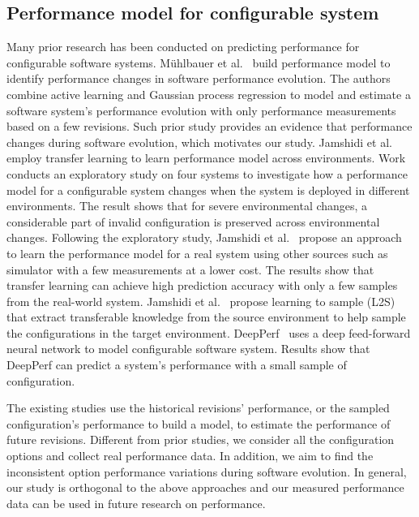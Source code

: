 \subsection{Performance model for configurable system}
Many prior research has been conducted on predicting performance for configurable software systems. 
M{\"{u}}hlbauer et al.~\cite{DBLP:conf/kbse/MuhlbauerAS19,DBLP:conf/kbse/MuhlbauerAS20} build performance model to identify performance changes in software performance evolution. The authors combine active learning and Gaussian process regression to model and estimate a software system’s performance evolution with only performance measurements based on a few revisions. Such prior study provides an evidence that performance changes during software evolution, which motivates our study. Jamshidi et al.~\cite{DBLP:conf/kbse/JamshidiSVKPA17,DBLP:conf/icse/JamshidiVKSK17,DBLP:conf/sigsoft/JamshidiVKS18} employ transfer learning to learn performance model across environments. Work~\cite{DBLP:conf/kbse/JamshidiSVKPA17} conducts an exploratory study on four systems to investigate how a performance model for a configurable system changes when the system is deployed in different environments. The result shows that for severe environmental changes, a considerable part of invalid configuration is preserved across environmental changes. Following the exploratory study, Jamshidi et al.~\cite{DBLP:conf/icse/JamshidiVKSK17} propose an approach to learn the performance model for a real system using other sources such as simulator with a few measurements at a lower cost. The results show that transfer learning can achieve high prediction accuracy with only a few samples from the real-world system. Jamshidi et al.~\cite{DBLP:conf/sigsoft/JamshidiVKS18} propose learning to sample (L2S) that extract transferable knowledge from the source environment to help sample the configurations in the target environment. DeepPerf~\cite{DBLP:conf/icse/HaZ19} uses a deep feed-forward neural network to model configurable software system. Results show that DeepPerf can predict a system's performance with a small sample of configuration. 

The existing studies use the historical revisions’ performance, or the sampled configuration’s performance to build a model, to estimate the performance of future revisions. Different from prior studies, we consider all the configuration options and collect real performance data. In addition, we aim to find the inconsistent option performance variations during software evolution. In general, our study is orthogonal to the above approaches and our measured performance data can be used in future research on performance.

